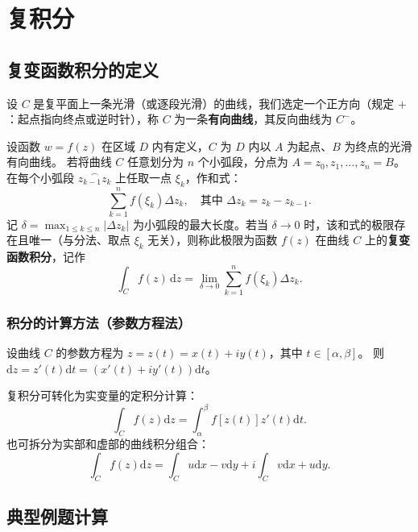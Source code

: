 \chapter{复积分}

\section{复变函数积分的定义}

设 $C$ 是复平面上一条光滑（或逐段光滑）的曲线，我们选定一个正方向（规定 $+$：起点指向终点或逆时针），称 $C$ 为一条\textbf{有向曲线}，其反向曲线为 $C^-$。

\begin{tcolorbox}[title=定义：复变函数积分, colframe=blue!50!black, colback=blue!5!white, sharp corners]
	设函数 $w=f(z)$ 在区域 $D$ 内有定义，$C$ 为 $D$ 内以 $A$ 为起点、$B$ 为终点的光滑有向曲线。
	若将曲线 $C$ 任意划分为 $n$ 个小弧段，分点为 $A=z_0, z_1, \dots, z_n=B$。在每个小弧段 $\overset{\frown}{z_{k-1}z_k}$ 上任取一点 $\xi_k$，作和式：
	\[
	\sum_{k=1}^n f(\xi_k) \Delta z_k, \quad \text{其中 } \Delta z_k = z_k - z_{k-1}.
	\]
	记 $\delta = \max_{1\leq k\leq n} |\Delta z_k|$ 为小弧段的最大长度。若当 $\delta \to 0$ 时，该和式的极限存在且唯一（与分法、取点 $\xi_k$ 无关），则称此极限为函数 $f(z)$ 在曲线 $C$ 上的\textbf{复变函数积分}，记作
	\[
	\int_C f(z) \, \mathrm{d}z = \lim_{\delta \to 0} \sum_{k=1}^n f(\xi_k) \Delta z_k.
	\]
\end{tcolorbox}

\subsection{积分的计算方法（参数方程法）}
设曲线 $C$ 的参数方程为 $z = z(t) = x(t) + iy(t)$，其中 $t \in [\alpha, \beta]$。
则 $\mathrm{d}z = z'(t) \mathrm{d}t = (x'(t) + iy'(t)) \mathrm{d}t$。

复积分可转化为实变量的定积分计算：
\[
\int_C f(z) \mathrm{d}z = \int_\alpha^\beta f[z(t)] z'(t) \mathrm{d}t.
\]
也可拆分为实部和虚部的曲线积分组合：
\[
\int_C f(z) \mathrm{d}z = \int_C u \mathrm{d}x - v \mathrm{d}y + i \int_C v \mathrm{d}x + u \mathrm{d}y.
\]

\section{典型例题计算}


